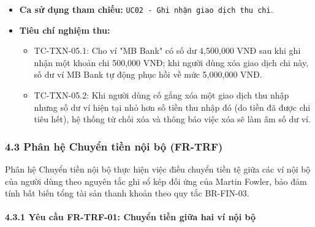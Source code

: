 \documentclass[11pt,a4paper]{article}
\providecommand{\tightlist}{
  \setlength{\itemsep}{0pt}\setlength{\parskip}{0pt}}
\begin{document}
\begin{itemize}
  \begin{itemize}
  \tightlist
  \item
    Bản ghi giao dịch bị xóa khỏi hệ thống.
  \item
    Số dư ví liên quan được hoàn nguyên chính xác.
  \item
    Thông báo xóa giao dịch thành công.
  \end{itemize}
\item
  \textbf{Ca sử dụng tham chiếu:}
  \texttt{UC02\ -\ Ghi\ nhận\ giao\ dịch\ thu\ chi}.
\item
  \textbf{Tiêu chí nghiệm thu:}

  \begin{itemize}
  \tightlist
  \item
    TC-TXN-05.1: Cho ví "MB Bank" có số dư 4,500,000 VNĐ sau khi ghi
    nhận một khoản chi 500,000 VNĐ; khi người dùng xóa giao dịch chi
    này, số dư ví MB Bank tự động phục hồi về mức 5,000,000 VNĐ.
  \item
    TC-TXN-05.2: Khi người dùng cố gắng xóa một giao dịch thu nhập nhưng
    số dư ví hiện tại nhỏ hơn số tiền thu nhập đó (do tiền đã được chi
    tiêu hết), hệ thống từ chối xóa và thông báo việc xóa sẽ làm âm số
    dư ví.
  \end{itemize}
\end{itemize}

\newpage

\subsubsection{4.3 Phân hệ Chuyển tiền nội bộ
(FR-TRF)}\label{43-phuxe2n-hux1ec7-chuyux1ec3n-tiux1ec1n-nux1ed9i-bux1ed9-fr-trf}

Phân hệ Chuyển tiền nội bộ thực hiện việc điều chuyển tiền tệ giữa các
ví nội bộ của người dùng theo nguyên tắc ghi sổ kép đối ứng của Martin
Fowler, bảo đảm tính bất biến tổng tài sản thanh khoản theo quy tắc
BR-FIN-03.

\paragraph{4.3.1 Yêu cầu FR-TRF-01: Chuyển tiền giữa hai ví nội bộ}
\label{431-yuxeau-cux1ea7u-fr-trf-01-chuyux1ec3n-tiux1ec1n-giux1eefa-hai-vuxed-nux1ed9i-bux1ed9}
\end{document}
